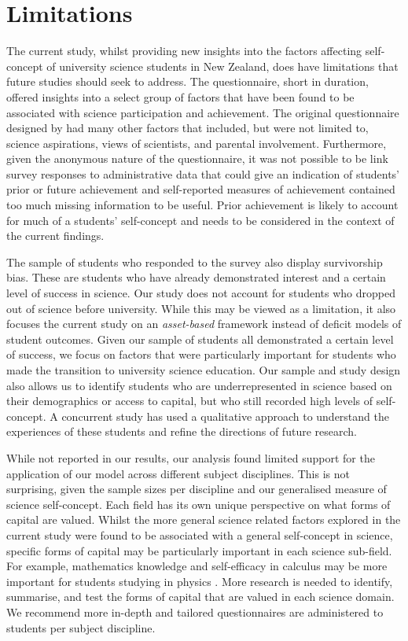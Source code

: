 \documentclass[smallextended]{svjour3}       %
\begin{document}
\section*{Limitations}
The current study, whilst providing new insights into the factors affecting self-concept of university science students in New Zealand, does have limitations that future studies should seek to address. The questionnaire, short in duration, offered insights into a select group of factors that have been found to be associated with science participation and achievement. The original questionnaire designed by \cite{dewitt2011high} had many other factors that included, but were not limited to, science aspirations, views of scientists, and parental involvement. Furthermore, given the anonymous nature of the questionnaire, it was not possible to be link survey responses to administrative data that could give an indication of students' prior or future achievement and self-reported measures of achievement contained too much missing information to be useful. Prior achievement is likely to account for much of a students' self-concept and needs to be considered in the context of the current findings.

The sample of students who responded to the survey also display survivorship bias. These are students who have already demonstrated interest and a certain level of success in science. Our study does not account for students who dropped out of science before university. While this may be viewed as a limitation, it also focuses the current study on an \textit{asset-based} framework instead of deficit models of student outcomes. Given our sample of students all demonstrated a certain level of success, we focus on factors that were particularly important for students who made the transition to university science education. Our sample and study design also allows us to identify students who are underrepresented in science based on their demographics or access to capital, but who still recorded high levels of self-concept. A concurrent study has used a qualitative approach to understand the experiences of these students and refine the directions of future research.

While not reported in our results, our analysis found limited support for the application of our model across different subject disciplines. This is not surprising, given the sample sizes per discipline and our generalised measure of science self-concept. Each field has its own unique perspective on what forms of capital are valued. Whilst the more general science related factors explored in the current study were found to be associated with a general self-concept in science, specific forms of capital may be particularly important in each science sub-field. For example, mathematics knowledge and self-efficacy in calculus may be more important for students studying in physics \cite{Black2016,Ellis_2016}. More research is needed to identify, summarise, and test the forms of capital that are valued in each science domain. We recommend more in-depth and tailored questionnaires are administered to students per subject discipline.  
\end{document}
